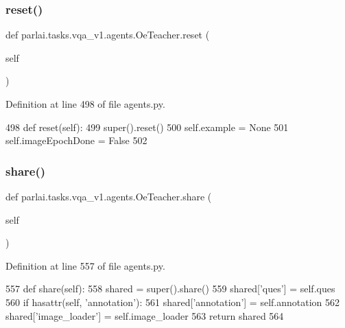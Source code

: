 \subsubsection{\texorpdfstring{reset()}{reset()}}
{\footnotesize\ttfamily def parlai.\+tasks.\+vqa\+\_\+v1.\+agents.\+Oe\+Teacher.\+reset (\begin{DoxyParamCaption}\item[{}]{self }\end{DoxyParamCaption})}



Definition at line 498 of file agents.\+py.


\begin{DoxyCode}
498     \textcolor{keyword}{def }reset(self):
499         super().reset()
500         self.example = \textcolor{keywordtype}{None}
501         self.imageEpochDone = \textcolor{keyword}{False}
502 
\end{DoxyCode}
\mbox{\label{classparlai_1_1tasks_1_1vqa__v1_1_1agents_1_1OeTeacher_ae61f906342533a155cfbcad318657ce9}} 
\subsubsection{\texorpdfstring{share()}{share()}}
{\footnotesize\ttfamily def parlai.\+tasks.\+vqa\+\_\+v1.\+agents.\+Oe\+Teacher.\+share (\begin{DoxyParamCaption}\item[{}]{self }\end{DoxyParamCaption})}



Definition at line 557 of file agents.\+py.


\begin{DoxyCode}
557     \textcolor{keyword}{def }share(self):
558         shared = super().share()
559         shared[\textcolor{stringliteral}{'ques'}] = self.ques
560         \textcolor{keywordflow}{if} hasattr(self, \textcolor{stringliteral}{'annotation'}):
561             shared[\textcolor{stringliteral}{'annotation'}] = self.annotation
562         shared[\textcolor{stringliteral}{'image\_loader'}] = self.image\_loader
563         \textcolor{keywordflow}{return} shared
564 
\end{DoxyCode}
\mbox{\label{classparlai_1_1tasks_1_1vqa__v1_1_1agents_1_1OeTeacher_aed7f88bcef1e901e87d0a947d180586f}} 
